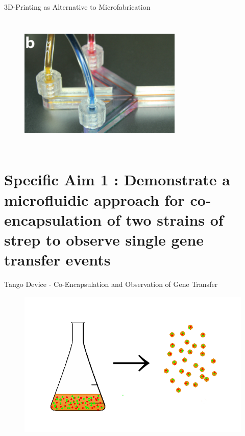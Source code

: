 \documentclass{beamer}
\begin{document}
\begin{frame}{3D-Printing as Alternative to Microfabrication}
\begin{columns}[c]
\begin{figure}
\includegraphics[width=1\linewidth]{images/folch2.png}\\
\hspace*{11pt}\hbox{\scriptsize {}}
 \end{figure}
\end{columns}
\end{frame}

\section{Specific Aim 1 : Demonstrate a microfluidic approach for co-encapsulation of two strains of strep to observe single gene transfer events}

\begin{frame}{Tango Device - Co-Encapsulation and Observation of Gene Transfer}
\begin{figure}
\includegraphics[width=0.8\linewidth]{images/flask-droplets.png}
\end{figure}
\end{frame}
\end{document}
